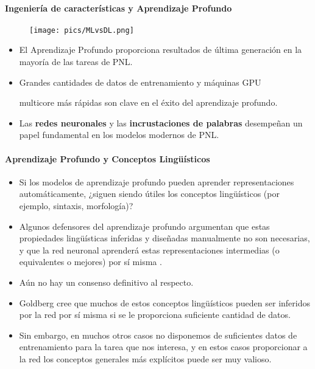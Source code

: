 \paragraph{Ingeniería de características y Aprendizaje Profundo}

\begin{figure}[h]
   \texttt{[image: pics/MLvsDL.png]}
\end{figure}

\begin{itemize}
   \item El Aprendizaje Profundo proporciona resultados de última generación en la mayoría de las tareas de PNL.
   \item Grandes cantidades de datos de entrenamiento y máquinas GPU

 multicore más rápidas son clave en el éxito del aprendizaje profundo.
   \item Las \textbf{redes neuronales} y las \textbf{incrustaciones de palabras} desempeñan un papel fundamental en los modelos modernos de PNL.

\end{itemize}

\paragraph{Aprendizaje Profundo y Conceptos Lingüísticos}
\begin{itemize}
   \item Si los modelos de aprendizaje profundo pueden aprender representaciones automáticamente, ¿siguen siendo útiles los conceptos lingüísticos (por ejemplo, sintaxis, morfología)?
   \item Algunos defensores del aprendizaje profundo argumentan que estas propiedades lingüísticas inferidas y diseñadas manualmente no son necesarias, y que la red neuronal aprenderá estas representaciones intermedias (o equivalentes o mejores) por sí misma \cite{goldberg2016primer}.
   \item Aún no hay un consenso definitivo al respecto.
   \item Goldberg cree que muchos de estos conceptos lingüísticos pueden ser inferidos por la red por sí misma si se le proporciona suficiente cantidad de datos.
   \item Sin embargo, en muchos otros casos no disponemos de suficientes datos de entrenamiento para la tarea que nos interesa, y en estos casos proporcionar a la red los conceptos generales más explícitos puede ser muy valioso.
\end{itemize}

